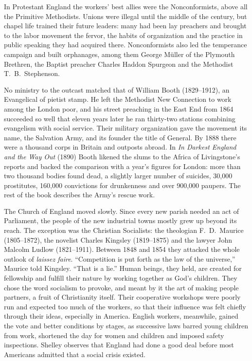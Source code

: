 In Protestant England the workers' best allies were the Nonconformists, above all the Primitive
Methodists. Unions were illegal until the middle of the century, but chapel life trained their future
leaders: many had been lay preachers and brought to the labor movement the fervor, the habits of
organization and the practice in public speaking they had acquired there. Nonconformists also led the
temperance campaign and built orphanages, among them George M\"uller of the Plymouth Brethren, the
Baptist preacher Charles Haddon Spurgeon and the Methodist T.~B.~Stephenson.

No ministry to the outcast matched that of William Booth (1829--1912), an Evangelical of pietist
stamp. He left the Methodist New Connection to work among the London poor, and his street preaching
in the East End from 1864 succeeded so well that eleven years later he ran thirty-two stations
combining evangelism with social service. Their military organization gave the movement its name, the
Salvation Army, and its founder the title of General. By 1888 there were a thousand corps in Britain
and outposts abroad. In \emph{In Darkest England and the Way Out} (1890) Booth likened the slums to
the Africa of Livingstone's reports and backed the comparison with a year's figures for London: more
than two thousand bodies found dead, a slightly larger number of suicides, 30,000 prostitutes,
160,000 convictions for drunkenness and over 900,000 paupers. The rest of the book describes the
Army's rescue work.

The Church of England moved slowly. Since every new parish needed an act of Parliament, the people of
the new industrial towns mostly grew up beyond its reach. The exception was the Christian Socialists:
the theologian F.~D.~Maurice (1805--1872), the novelist Charles Kingsley (1819--1875) and the lawyer
John Malcolm Ludlow (1821--1911). Between 1848 and 1854 they attacked the whole outlook of
\emph{laissez faire}. ``Competition is put forth as the law of the universe,'' Maurice told Kingsley.
``That is a lie.'' Human beings, they held, are created for fellowship and fulfill their nature by
working together as God's children. They chose the word socialism to provoke, and meant by it the art
of making people partners, a fruit of Christianity itself. Their cooperative workshops were poorly
run and expected too much of the workers, so that their influence was felt chiefly through their
ideas, especially in America. English workers, meanwhile, gained the vote and better conditions by
stages, as successive laws barred young children from work, shortened the day for women and children
and imposed safety inspections. Shelley observes that England had done a good deal before most
Americans admitted that a social crisis existed.

